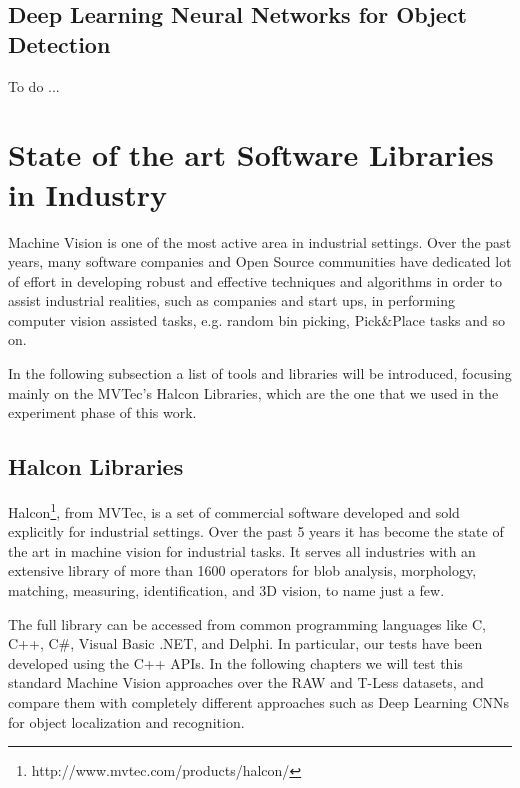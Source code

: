 \subsection{Deep Learning Neural Networks for Object Detection}\label{subsec:dl_obj_detection}
To do ...

\section{State of the art Software Libraries in Industry}\label{sec:industrylibraries}
Machine Vision is one of the most active area in industrial settings. Over the past years, many software companies and Open Source communities have dedicated lot of effort in developing robust and effective techniques and algorithms in order to assist industrial realities, such as companies and start ups, in performing computer vision assisted tasks, e.g. random bin picking, Pick\&Place tasks and so on.

In the following subsection a list of tools and libraries will be introduced, focusing mainly on the MVTec's Halcon Libraries, which are the one that we used in the experiment phase of this work. 

\subsection{Halcon Libraries}\label{subsec:halconlibs}
Halcon\footnote{http://www.mvtec.com/products/halcon/}, from MVTec, is a set of commercial software developed and sold explicitly for industrial settings. Over the past 5 years it has become the state of the art in machine vision for industrial tasks. It serves all industries with an extensive library of more than 1600 operators for blob analysis, morphology, matching, measuring, identification, and 3D vision, to name just a few.

The full library can be accessed from common programming languages like C, C++, C\#, Visual Basic .NET, and Delphi. In particular, our tests have been developed using the C++ APIs. In the following chapters we will test this standard Machine Vision approaches over the RAW and T-Less datasets, and compare them with completely different approaches such as Deep Learning CNNs for object localization and recognition.

